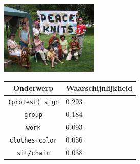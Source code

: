 \begin{figure}
\begin{subfigure}{\textwidth}
    \centering
    \begin{minipage}[t][3.5cm]{.5\linewidth}
    \centering
    \vspace{0pt}
    \includegraphics[height=3.5cm]{Images/LDA/4386588.jpg}
    \end{minipage}\hfill
    \begin{minipage}[t][3.5cm]{.5\textwidth}
    \centering
    \vspace{0pt}
    \begin{tabularx}{\textwidth}{cl}
            Onderwerp                           & Waarschijnlijkheid\\
            \hline
            \texttt{(protest) sign} & 0,293\\
            \texttt{group} & 0,184\\
            \texttt{work} & 0,093\\
            \texttt{clothes+color} & 0,056\\
            \texttt{sit/chair} & 0,038\\
            \hline
        \end{tabularx}
    \end{minipage}
\end{subfigure}

\vspace*{4mm}


\end{figure}
